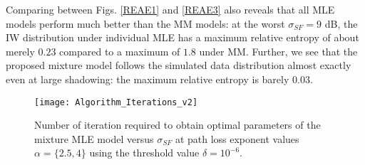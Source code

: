 \documentclass[12pt, draftclsnofoot, onecolumn]{IEEEtran}
\theoremstyle{plain}
\begin{document}
Comparing between Figs. \ref{REAE1} and \ref{REAE3} also reveals that all MLE models perform much better than the MM models: at the worst $\sigma_{SF}=9$ dB, the IW distribution under individual MLE has a maximum relative entropy of about merely $0.23$ compared to a maximum of $1.8$ under MM. Further, we see that the proposed mixture model follows the simulated data distribution almost exactly even at large shadowing: the maximum relative entropy is barely $0.03$.
\iffalse
\begin{figure*}
\centering
\begin{minipage}[b]{.5\textwidth}
\centering
\texttt{[image: Sigma\_Threshold\_MM]}
        \DeclareGraphicsExtensions{.eps}
        \vspace{-0.2in}
        \caption{Regions of shadowing standard deviation and path loss exponent for the IG MM model to fit within $1\%$ of the mixture MLE model $\left(P_{max}=30\text{ dBm}, \eta=1 \right)$. The IG MM region shrinks as UE density factor, $\eta$, increases.} 
        \label{SigTAaEa}
\end{minipage}\quad
\begin{minipage}[b]{.47\textwidth}
\centering
\texttt{[image: Algorithm\_Iterations\_v2]}
        \DeclareGraphicsExtensions{.eps}
        \vspace{-0.2in}
        \caption{Number of iteration required to obtain optimal parameters of the mixture MLE model versus $\sigma_{SF}$ at path loss exponent values $\alpha = \{2.5, 4\}$ using the threshold value $\delta = 10^{-6}$.} 
        \label{iterations}
\end{minipage}\vspace{-0.45in}\vspace{-.15in}
\end{figure*}
\fi
%
\iffalse
\begin{figure}[t]%
        \centering
\texttt{[image: Algorithm\_Iterations\_v2]}
        \vspace{-0.2in}
        \caption{Number of iteration required to obtain optimal parameters of the mixture MLE model versus $\sigma_{SF}$ at path loss exponent values $\alpha = \{2.5, 4\}$ using the threshold value $\delta = 10^{-6}$.} 
        \label{iterations}
        \vspace{-.45in}
\end{figure}%
\end{document}
